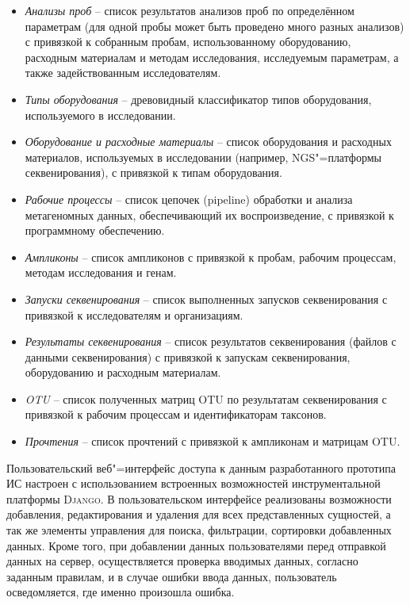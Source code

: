\documentclass[a4paper,12pt,openany,final]{extreport}
\begin{document}
\begin{itemize}
\item \emph{Анализы проб} -- список результатов анализов проб по определённом параметрам (для одной пробы может быть проведено много разных анализов) с привязкой к собранным пробам, использованному оборудованию, расходным материалам и методам исследования, исследуемым параметрам, а также задействованным исследователям.
\item \emph{Типы оборудования} -- древовидный классификатор типов оборудования, используемого в исследовании.
\item \emph{Оборудование и расходные материалы} -- список оборудования и расходных материалов, используемых в исследовании (например, NGS"=платформы секвенирования), с привязкой к типам оборудования.
\item \emph{Рабочие процессы} -- список цепочек (pipeline) обработки и анализа метагеномных данных, обеспечивающий их воспроизведение, с привязкой к программному обеспечению.
\item \emph{Ампликоны} -- список ампликонов с привязкой к пробам, рабочим процессам, методам исследования и генам.
\item \emph{Запуски секвенирования} -- список выполненных запусков секвенирования с привязкой к исследователям и организациям.
\item \emph{Результаты секвенирования} -- список результатов секвенирования (файлов с данными секвенирования) с привязкой к запускам секвенирования, оборудованию и расходным материалам.
\item \emph{OTU} -- список полученных матриц OTU по результатам секвенирования с привязкой к рабочим процессам и идентификаторам таксонов.
\item \emph{Прочтения} -- список прочтений с привязкой к ампликонам и матрицам OTU.
\end{itemize}

Пользовательский веб"=интерфейс доступа к данным разработанного прототипа ИС настроен с использованием встроенных возможностей инструментальной платформы \textsc{Django}. В пользовательском интерфейсе реализованы возможности добавления, редактирования и удаления для всех представленных сущностей, а так же элементы управления для поиска, фильтрации, сортировки добавленных данных. Кроме того, при добавлении данных пользователями перед отправкой данных на сервер, осуществляется проверка вводимых данных, согласно заданным правилам, и в случае ошибки ввода данных, пользователь осведомляется, где именно произошла ошибка.
\end{document}
